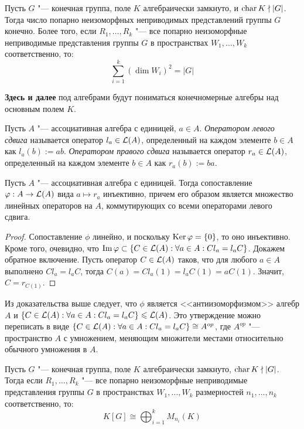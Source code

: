 \begin{corollary}
	Пусть $G$ "--- конечная группа, поле $K$ алгебраически замкнуто, и $\operatorname{char}{K} \nmid |G|$. Тогда число попарно неизоморфных неприводимых представлений группы $G$ конечно. Более того, если $R_1, \dotsc, R_k$ "--- все попарно неизоморфные неприводимые представления группы $G$ в пространствах $W_1, \dotsc, W_k$ соответственно, то:
	\[\sum_{i = 1}^k\left(\dim{W_i}\right)^2 = |G|\]
\end{corollary}

\textbf{Здесь и далее} под алгебрами будут пониматься конечномерные алгебры над основным полем $K$.

\begin{definition}
	Пусть $A$ "--- ассоциативная алгебра с единицей, $a \in A$. \textit{Оператором левого сдвига} называется оператор $l_a \in \mathcal L(A)$, определенный на каждом элементе $b \in A$ как $l_a(b) := ab$. \textit{Оператором правого сдвига} называется оператор $r_a \in \mathcal L(A)$, определенный на каждом элементе $b \in A$ как $r_a(b) := ba$.
\end{definition}

\begin{proposition}
	Пусть $A$ "--- ассоциативная алгебра с единицей. Тогда сопоставление $\varphi: A \to \mathcal L(A)$ вида $a \mapsto r_a$ инъективно, причем его образом является множество линейных операторов на $A$, коммутирующих со всеми операторами левого сдвига.
\end{proposition}

\begin{proof}
	Сопоставление $\phi$ линейно, и поскольку $\operatorname{Ker}\varphi = \{0\}$, то оно инъективно. Кроме того, очевидно, что $\operatorname{Im}\varphi \subset \{C\in \mathcal L(A): \forall a \in A: Cl_a = l_aC\}$. Докажем обратное включение. Пусть оператор $C \in \mathcal L(A)$ таков, что для любого $a \in A$ выполнено $Cl_a = l_aC$, тогда $C(a) = Cl_a(1) = l_aC(1) = aC(1)$. Значит, $C = r_{C(1)}$.
\end{proof}

\begin{note}
	Из доказательства выше следует, что $\phi$ является <<антиизоморфизмом>> алгебр $A$ и $\{C\in \mathcal L(A): \forall a \in A: Cl_a = l_aC\} \leqslant \mathcal L(A)$. Это утверждение можно переписать в виде $\{C\in \mathcal L(A): \forall a \in A: Cl_a = l_aC\} \cong A^{op}$, где $A^{op}$ "--- пространство $A$ с умножением, меняющим множители местами относительно обычного умножения в $A$.
\end{note}

\begin{theorem}
	Пусть $G$ "--- конечная группа, поле $K$ алгебраически замкнуто, $\operatorname{char}{K} \nmid |G|$. Тогда если $R_1, \dotsc, R_k$ "--- все попарно неизоморфные неприводимые представления группы $G$ в пространствах $W_1, \dotsc, W_k$ размерностей $n_1, \dotsc, n_k$ соответственно, то:
	\[K[G] \cong \bigoplus_{i=1}^kM_{n_i}(K)\]
\end{theorem}

